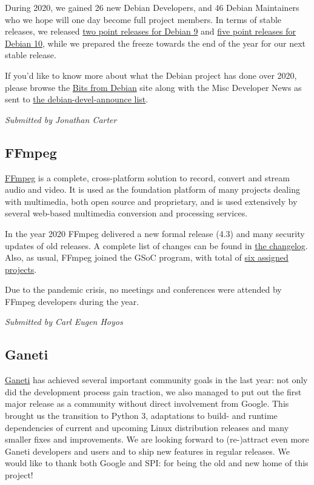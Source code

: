 \documentclass[a4paper]{report}
\begin{document}
During 2020, we gained 26 new Debian Developers, and 46 Debian Maintainers who we hope will one day become full project members.  In terms of stable releases, we released \href{https://wiki.debian.org/DebianStretch#Release_and_updates}{two point releases for Debian 9} and \href{https://wiki.debian.org/DebianBuster#Release_and_updates}{five point releases for Debian 10}, while we prepared the freeze towards the end of the year for our next stable release.

If you'd like to know more about what the Debian project has done over 2020, please browse the \href{https://bits.debian.org/}{Bits from Debian} site along with the Misc Developer News as sent to \href{https://lists.debian.org/debian-devel-announce/}{the debian-devel-announce list}.

{\em Submitted by Jonathan Carter}

\subsection{FFmpeg}

\href{https://www.ffmpeg.org/}{FFmpeg} is a complete, cross-platform solution to record, convert and stream audio and video. It is used as the foundation platform of many projects dealing with multimedia, both open source and proprietary, and is used extensively by several web-based multimedia conversion and processing services.

In the year 2020 FFmpeg delivered a new formal release (4.3) and many security updates of old releases. A complete list of changes can be found in \href{https://git.ffmpeg.org/gitweb/ffmpeg.git/blob/HEAD:/Changelog}{the changelog}.  Also, as usual, FFmpeg joined the GSoC program, with total of \href{https://trac.ffmpeg.org/wiki/SponsoringPrograms/GSoC/2020/Results}{six assigned projects}.

Due to the pandemic crisis, no meetings and conferences were attended by FFmpeg developers during the year.

{\em Submitted by Carl Eugen Hoyos}

\subsection{Ganeti}

\href{https://ganeti.org/}{Ganeti} has achieved several important community goals in the last year: not only did the development process gain traction, we also managed to put out the first major release as a community without direct involvement from Google. This brought us the transition to Python 3, adaptations to build- and runtime dependencies of current and upcoming Linux distribution releases and many smaller fixes and improvements. We are looking forward to (re-)attract even more Ganeti developers and users and to ship new features in regular releases. We would like to thank both Google and SPI: for being the old and new home of this project!
\end{document}
